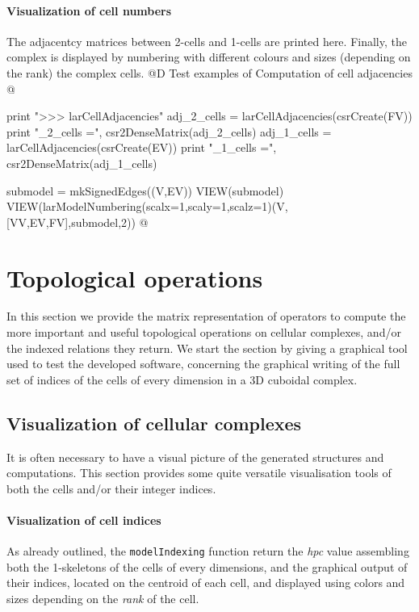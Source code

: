 \documentclass[11pt,oneside]{article}    %
\begin{document}
\paragraph{Visualization of cell numbers}
The adjacentcy matrices between 2-cells and 1-cells are printed here. Finally, the complex is displayed by numbering with different colours and sizes (depending on the rank) the complex cells.
@D Test examples of Computation of cell adjacencies
@{
print "\n>>> larCellAdjacencies"
adj_2_cells = larCellAdjacencies(csrCreate(FV))
print "\nadj_2_cells =\n", csr2DenseMatrix(adj_2_cells)
adj_1_cells = larCellAdjacencies(csrCreate(EV))
print "\nadj_1_cells =\n", csr2DenseMatrix(adj_1_cells)

submodel = mkSignedEdges((V,EV))
VIEW(submodel)
VIEW(larModelNumbering(scalx=1,scaly=1,scalz=1)(V,[VV,EV,FV],submodel,2))
@}


\section{Topological operations}

In this section we provide the matrix representation of operators to compute the more important and useful topological operations on cellular complexes, and/or the indexed relations they return. We start the section by giving a graphical tool used to test the developed software, concerning the graphical writing of the full set of indices of the cells of every dimension in a 3D cuboidal complex.  

\subsection{Visualization of cellular complexes}

It is often necessary to have a visual picture of the generated structures and computations.
This section provides some quite versatile visualisation tools of both the cells and/or their integer indices.

\paragraph{Visualization of cell indices}
As already outlined, the \texttt{modelIndexing} function return the \emph{hpc} value assembling both the 1-skeletons of the cells of every dimensions, and the graphical output of their indices, located on the centroid of each cell, and displayed using colors and sizes depending on the \emph{rank} of the cell.
\end{document}
